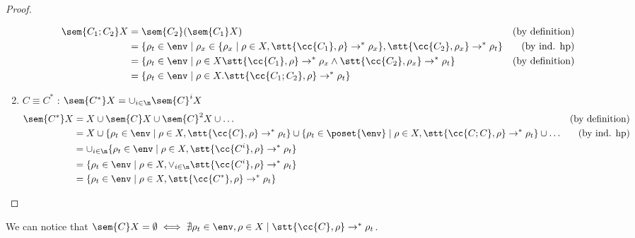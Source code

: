 \begin{proof}
\begin{enumerate}
    \begin{align*}
      \sem{C_1;C_2}X & = \sem{C_2}(\sem{C_1}X) & \text{(by definition)}\\
      & = \{\rho_t \in\env \mid \rho_x \in \{\rho_x \mid \rho \in X, \stt{\cc{C_1}, \rho}  \to^* \rho_x\}, \stt{\cc{C_2}, \rho_x} \to^* \rho_t\} & \text{(by ind. hp)}\\
      & = \{\rho_t \in\env \mid \rho \in X \stt{\cc{C_1}, \rho} \to^* \rho_x \wedge \stt{\cc{C_2}, \rho_x} \to^* \rho_t\} & \text{(by definition)}\\
      & = \{\rho_t \in\env \mid \rho \in X . \stt{\cc{C_1;C_2}, \rho} \to^* \rho_t\}
    \end{align*}
  \item \(C \equiv C^*\) : \(\sem{C^*}X = \cup_{i\in\n}\sem{C}^i X\)
    \begin{align*}
      \sem{C^*}X & = X \cup \sem{C}X \cup \sem{C}^2X \cup \dots & \text{(by definition)}\\
      & = X \cup \{\rho_t \in\env \mid \rho \in X, \stt{\cc{C},\rho} \to^* \rho_t\} \cup \{\rho_t \in\poset{\env} \mid \rho \in X, \stt{\cc{C;C},\rho} \to^* \rho_t\} \cup \dots & \text{(by ind. hp)}\\
      & = \cup_{i\in\n} \{\rho_t \in\env \mid \rho \in X, \stt{\cc{C^i}, \rho} \to^*  \rho_t\} \\
      & = \{\rho_t \in\env \mid \rho \in X, \vee_{i\in\n} \stt{\cc{C^i}, \rho} \to^* \rho_t\} \\
      & = \{\rho_t \in\env \mid \rho \in X, \stt{\cc{C^*}, \rho} \to^* \rho_t\}
    \end{align*}
  \end{enumerate}
\end{proof}

We can notice that \(\sem{C}X = \emptyset \iff \nexists \rho_t\in\env,
\rho \in X \mid \stt{\cc{C},\rho} \to^* \rho_t\).

